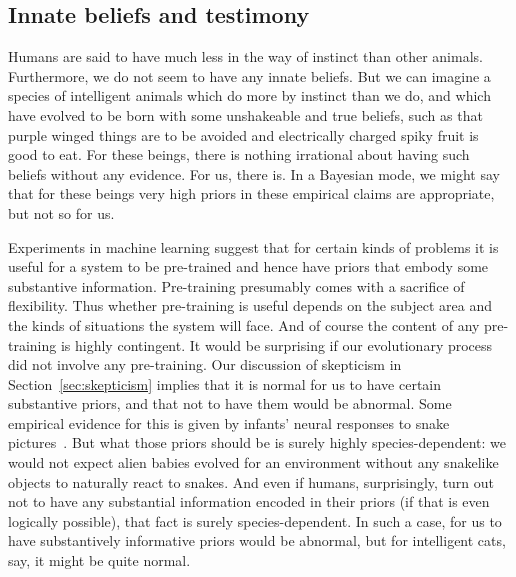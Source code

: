 \subsection{Innate beliefs and testimony}
Humans are said to have much less in the way of instinct than other animals. Furthermore, we do not seem to
have any innate beliefs. But we can imagine a species of intelligent animals which do more by instinct than we do,
and which have evolved to be born with some unshakeable and true beliefs, such as that purple winged things are to 
be avoided and electrically charged spiky fruit is good to eat. For these beings, there is nothing irrational about 
having such beliefs without any evidence. For us, there is. In a Bayesian mode, we might say that for these
beings very high priors in these empirical claims are appropriate, but not so for us. 

Experiments in machine learning suggest that for certain kinds of problems it is useful for a system to be pre-trained
and hence have priors that embody some substantive information. Pre-training presumably comes with a sacrifice of flexibility.
Thus whether pre-training is useful depends on the subject area and the kinds of situations the system will face. And
of course the content of any pre-training is highly contingent. It would be surprising if our evolutionary process did not 
involve any pre-training. Our discussion of skepticism in Section~\ref{sec:skepticism} implies that it is normal for us to have certain substantive 
priors, and that not to have them would be abnormal. Some empirical evidence for this is given by infants' neural responses to
snake pictures~\parencite{BertelsSnakes}. But what those priors should be is surely highly 
species-dependent: we would not expect alien babies evolved for an environment without any snakelike objects to naturally
react to snakes. And even if humans, surprisingly, turn out not to have any substantial information encoded in their priors (if that is even logically 
possible), that fact is surely species-dependent. In such a case, for us to have substantively informative priors would be
abnormal, but for intelligent cats, say, it might be quite normal. 

